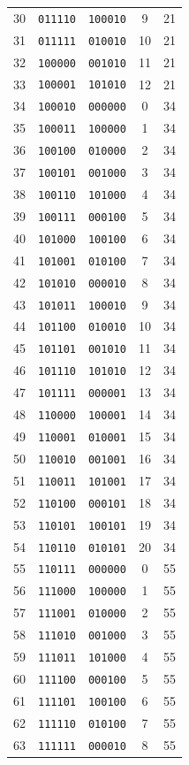 \begin{tabular}{rcccc}
30&\texttt{011110}&\texttt{100010}&9&21\\%
31&\texttt{011111}&\texttt{010010}&10&21\\%
32&\texttt{100000}&\texttt{001010}&11&21\\%
33&\texttt{100001}&\texttt{101010}&12&21\\%
34&\texttt{100010}&\texttt{000000}&0&34\\%
35&\texttt{100011}&\texttt{100000}&1&34\\%
36&\texttt{100100}&\texttt{010000}&2&34\\%
37&\texttt{100101}&\texttt{001000}&3&34\\%
38&\texttt{100110}&\texttt{101000}&4&34\\%
39&\texttt{100111}&\texttt{000100}&5&34\\%
40&\texttt{101000}&\texttt{100100}&6&34\\%
41&\texttt{101001}&\texttt{010100}&7&34\\%
42&\texttt{101010}&\texttt{000010}&8&34\\%
43&\texttt{101011}&\texttt{100010}&9&34\\%
44&\texttt{101100}&\texttt{010010}&10&34\\%
45&\texttt{101101}&\texttt{001010}&11&34\\%
46&\texttt{101110}&\texttt{101010}&12&34\\%
47&\texttt{101111}&\texttt{000001}&13&34\\%
48&\texttt{110000}&\texttt{100001}&14&34\\%
49&\texttt{110001}&\texttt{010001}&15&34\\%
50&\texttt{110010}&\texttt{001001}&16&34\\%
51&\texttt{110011}&\texttt{101001}&17&34\\%
52&\texttt{110100}&\texttt{000101}&18&34\\%
53&\texttt{110101}&\texttt{100101}&19&34\\%
54&\texttt{110110}&\texttt{010101}&20&34\\%
55&\texttt{110111}&\texttt{000000}&0&55\\%
56&\texttt{111000}&\texttt{100000}&1&55\\%
57&\texttt{111001}&\texttt{010000}&2&55\\%
58&\texttt{111010}&\texttt{001000}&3&55\\%
59&\texttt{111011}&\texttt{101000}&4&55\\%
60&\texttt{111100}&\texttt{000100}&5&55\\%
61&\texttt{111101}&\texttt{100100}&6&55\\%
62&\texttt{111110}&\texttt{010100}&7&55\\%
63&\texttt{111111}&\texttt{000010}&8&55\\%
\hline%
\end{tabular}
